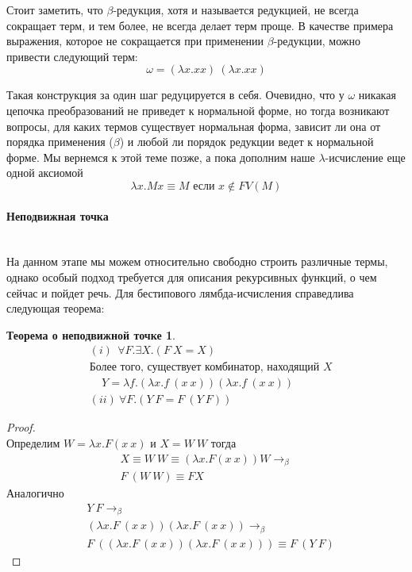 \documentclass[lambda.tex]{subfiles}
\begin{document}
Стоит заметить, что $\beta$-редукция, хотя и называется редукцией, не всегда сокращает терм, и тем более, не всегда делает терм проще. В качестве примера выражения, которое не сокращается при применении $\beta$-редукции, можно привести следующий терм:
\begin{equation*}
	\omega = (\lambda x.xx)\ (\lambda x.xx)
\end{equation*}

Такая конструкция за один шаг редуцируется в себя. Очевидно, что у $\omega$ никакая цепочка преобразований не приведет к нормальной форме, но тогда возникают вопросы, для каких термов существует нормальная форма, зависит ли она от порядка применения ($\beta$) и любой ли порядок редукции ведет к нормальной форме. Мы вернемся к этой теме позже, а пока дополним наше $\lambda$-исчисление еще одной аксиомой
\begin{equation*}
	\lambda x.Mx \equiv M \text{ если }x \not\in FV(M) \tag{$\eta$}
\end{equation*}

\newpage
\paragraph{Неподвижная точка} %
\label{par:fix point}~\\

На данном этапе мы можем относительно свободно строить различные термы, однако особый подход требуется для описания рекурсивных функций, о чем сейчас и пойдет речь. Для бестипового лямбда-исчисления справедлива следующая теорема:
\newtheorem*{fixpoint}{Теорема о неподвижной точке}
\begin{fixpoint}
\begin{align*}
	&(i)\ \ \forall F. \exists X. (F\ X = X) \\
	&\text{Более того, существует комбинатор, находящий $X$}\\
	&\ \ \ \ \ Y = \lambda f.(\lambda x.f\ (x\ x)) (\lambda x.f\ (x\ x))\\
	&(ii)\ \forall F.(Y\ F=F\ (Y\ F))
\end{align*}
\end{fixpoint}

\begin{proof}~\\
Определим $W = \lambda x.F(x\ x)$ и $X = W\ W$ тогда
\begin{align*}
	X \equiv W\ W \equiv (\lambda x.F(x\ x))W \rightarrow_\beta\\
	F\ (W\ W) \equiv F X
\end{align*}
Аналогично
\begin{align*}
	&Y\ F \rightarrow_\beta\\
	&(\lambda x.F\ (x\ x)) (\lambda x.F\ (x\ x)) \rightarrow_\beta\\
	&F\ ((\lambda x.F\ (x\ x)) (\lambda x.F\ (x\ x))) \equiv F\ (Y\ F)
\end{align*}
\end{proof}
\end{document}
